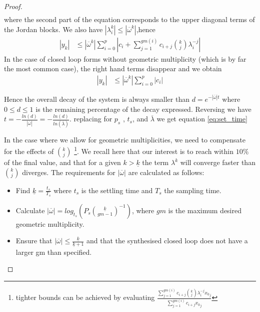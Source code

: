 \documentclass[sigconf]{llncs}
\newcommand{\mat}[1]{{#1}}
\renewcommand{\vec}[1]{{#1}}
\begin{document}
\begin{proof}
\begin{align}
\end{align}
where the second  part of the equation corresponds to the upper diagonal
terms of the Jordan blocks.  We also have $|\lambda_i^k|\leq
|\overline{\omega}^k|$,hence
%
\begin{align}
|y_k|&\leq |\overline{\omega}^k|\sum_{i=0}^p \left|c_i + \sum\limits_{j=1}^{gm(i)}c_{i+j}\binom{k}{j} \lambda_i^{-j}\right|
\end{align}
%
In the case of closed loop forms without geometric multiplicity (which is by far the most common case),
the right hand terms disappear and we obtain
%
\begin{align}
|y_k|&\leq |\overline{\omega}^k|\sum_{i=0}^p |c_i|
\end{align}

Hence the overall decay of the system is always smaller
than $d=e^{-|\overline{\omega}| t}$ where $0\leq d\leq 1$ is the remaining
percentage of the decay expressed.  Reversing we have
$t=-\frac{ln(d)}{|\overline{\omega}|}=-\frac{ln(d)}{ln(\overline{\lambda})}$. 
replacing for $p_s$ , $t_s$, and $\overline{\lambda}$ we get equation
\eqref{eq:set_time}
%

In the case where we allow for geometric multiplicities, we need to compensate for
the effects of $\binom{k}{j}$ \footnote{tighter bounds can be achieved by evaluating $\frac{\sum\limits_{j=1}^{gm(i)}c_{i+j}\binom{k}{j} \lambda_i^{-j}{\vec{x}_0}_j}{\sum\limits_{j=1}^{gm(i)}c_{i+j}{\vec{x}_0}_j}$}. We recall here that our interest is to reach
within $10\%$ of the final value, and that for a given $k>\underline{k}$ the
term $\lambda^k$ will converge faster than $\binom{k}{j}$ diverges.
The requirements for $|\overline{\omega}|$ are calculated as follows:
\begin{itemize}
\item Find $\underline{k}=\frac{t_s}{T_s}$ where $t_s$ is the settling time and $T_s$ the sampling time.
\item Calculate $|\overline{\omega}|=log_{t_s}\left(P_s\binom{\underline{k}}{gm-1}^{-1}\right)$,
where $gm$ is the maximum desired geometric multiplicity.
\item Ensure that $|\overline{\omega}| \leq \frac{\underline{k}}{\underline{k}+1}$ and that the
synthesised closed loop does not have a larger gm than specified.
\end{itemize}
\end{proof}
\end{document}
